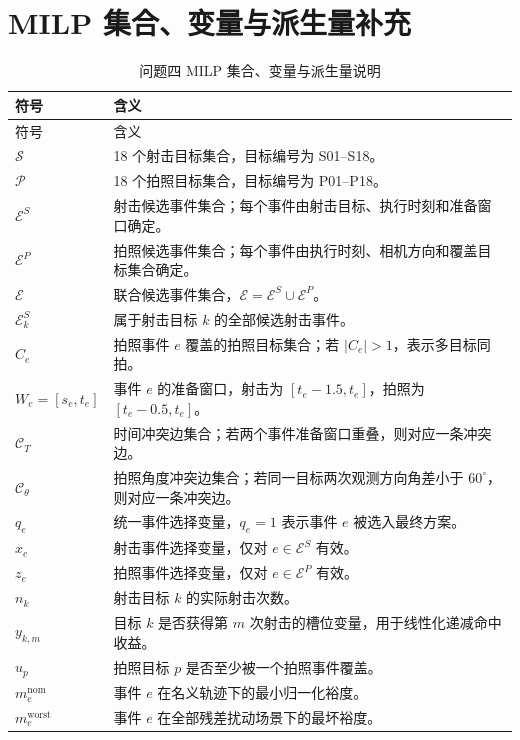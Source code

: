 \documentclass{cumcmthesis}
\begin{document}
\section{MILP 集合、变量与派生量补充}
\begin{longtable}{p{}p{}}
  \caption{问题四 MILP 集合、变量与派生量说明}\label{tab:milp_symbols_appendix}\\
  \toprule
  符号 & 含义\\
  \midrule
  \endfirsthead
  \toprule
  符号 & 含义\\
  \midrule
  \endhead
  $\mathcal S$ & 18 个射击目标集合，目标编号为 S01--S18。\\
  $\mathcal P$ & 18 个拍照目标集合，目标编号为 P01--P18。\\
  $\mathcal E^S$ & 射击候选事件集合；每个事件由射击目标、执行时刻和准备窗口确定。\\
  $\mathcal E^P$ & 拍照候选事件集合；每个事件由执行时刻、相机方向和覆盖目标集合确定。\\
  $\mathcal E$ & 联合候选事件集合，$\mathcal E=\mathcal E^S\cup\mathcal E^P$。\\
  $\mathcal E_k^S$ & 属于射击目标 $k$ 的全部候选射击事件。\\
  $C_e$ & 拍照事件 $e$ 覆盖的拍照目标集合；若 $|C_e|>1$，表示多目标同拍。\\
  $W_e=[s_e,t_e]$ & 事件 $e$ 的准备窗口，射击为 $[t_e-1.5,t_e]$，拍照为 $[t_e-0.5,t_e]$。\\
  $\mathcal C_T$ & 时间冲突边集合；若两个事件准备窗口重叠，则对应一条冲突边。\\
  $\mathcal C_\theta$ & 拍照角度冲突边集合；若同一目标两次观测方向角差小于 $60^\circ$，则对应一条冲突边。\\
  $q_e$ & 统一事件选择变量，$q_e=1$ 表示事件 $e$ 被选入最终方案。\\
  $x_e$ & 射击事件选择变量，仅对 $e\in\mathcal E^S$ 有效。\\
  $z_e$ & 拍照事件选择变量，仅对 $e\in\mathcal E^P$ 有效。\\
  $n_k$ & 射击目标 $k$ 的实际射击次数。\\
  $y_{k,m}$ & 目标 $k$ 是否获得第 $m$ 次射击的槽位变量，用于线性化递减命中收益。\\
  $u_p$ & 拍照目标 $p$ 是否至少被一个拍照事件覆盖。\\
  $m_e^{\mathrm{nom}}$ & 事件 $e$ 在名义轨迹下的最小归一化裕度。\\
  $m_e^{\mathrm{worst}}$ & 事件 $e$ 在全部残差扰动场景下的最坏裕度。\\

\end{longtable}
\end{document}
